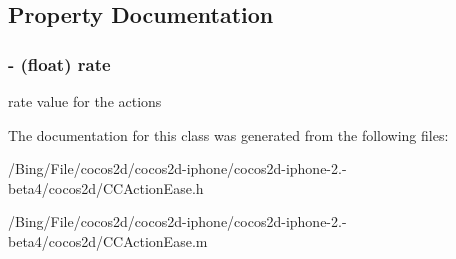 \subsection{Property Documentation}
\hypertarget{interface_c_c_ease_rate_action_a65bc459f66b97752751340c9cfed8e74}{
\subsubsection[{rate}]{\setlength{\rightskip}{0pt plus 5cm}-\/ (float) {\bf rate}}}\label{interface_c_c_ease_rate_action_a65bc459f66b97752751340c9cfed8e74}
rate value for the actions 

The documentation for this class was generated from the following files\-:\begin{DoxyCompactItemize}
\item 
/\-Bing/\-File/cocos2d/cocos2d-\/iphone/cocos2d-\/iphone-\/2.-\/beta4/cocos2d/C\-C\-Action\-Ease.\-h\item 
/\-Bing/\-File/cocos2d/cocos2d-\/iphone/cocos2d-\/iphone-\/2.-\/beta4/cocos2d/C\-C\-Action\-Ease.\-m\end{DoxyCompactItemize}
